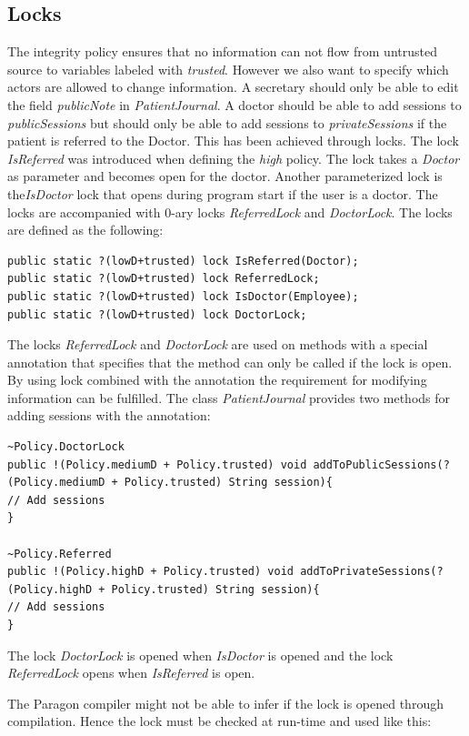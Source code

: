 \subsection{Locks}
The integrity policy ensures that no information can not flow from untrusted source to variables labeled with \emph{trusted}. However we also want to specify which actors are allowed to change information. A secretary should only be able to edit the field \emph{publicNote} in \emph{PatientJournal}. A doctor should be able to add sessions to \emph{publicSessions} but should only be able to add sessions to \emph{privateSessions} if the patient is referred to the Doctor. This has been achieved through locks. The lock \emph{IsReferred} was introduced when defining the \emph{high} policy. The lock takes a \emph{Doctor} as parameter and becomes open for the doctor. Another parameterized lock is the\emph{IsDoctor} lock that opens during program start if the user is a doctor. The locks are accompanied with 0-ary locks \emph{ReferredLock} and \emph{DoctorLock}. The locks are defined as the following: 

\begin{lstlisting}
public static ?(lowD+trusted) lock IsReferred(Doctor); 
public static ?(lowD+trusted) lock ReferredLock;
public static ?(lowD+trusted) lock IsDoctor(Employee);
public static ?(lowD+trusted) lock DoctorLock;
\end{lstlisting}

The locks \emph{ReferredLock} and \emph{DoctorLock} are used on methods with a special annotation that specifies that the method can only be called if the lock is open. By using lock combined with the annotation the requirement for modifying information can be fulfilled. The class \emph{PatientJournal} provides two methods for adding sessions with the annotation:

\begin{lstlisting}
~Policy.DoctorLock
public !(Policy.mediumD + Policy.trusted) void addToPublicSessions(?(Policy.mediumD + Policy.trusted) String session){
// Add sessions
} 

~Policy.Referred
public !(Policy.highD + Policy.trusted) void addToPrivateSessions(?(Policy.highD + Policy.trusted) String session){
// Add sessions
} 	
\end{lstlisting}  

The lock \emph{DoctorLock} is opened when \emph{IsDoctor} is opened and the lock \emph{ReferredLock} opens when \emph{IsReferred} is open. 

The Paragon compiler might not be able to infer if the lock is opened through compilation. Hence the lock must be checked at run-time and used like this:

